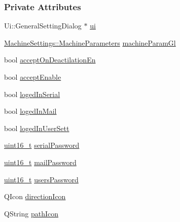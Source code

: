 \subsubsection*{Private Attributes}
\begin{DoxyCompactItemize}
\item 
Ui\+::\+General\+Setting\+Dialog $\ast$ \mbox{\hyperlink{classGeneralSettingDialog_a2985b76397645d9f6d0cd00bccb337dc}{ui}}
\item 
\mbox{\hyperlink{classMachineSettings_a87879e13793dbc7c10d4fa18e1236751}{Machine\+Settings\+::\+Machine\+Parameters}} \mbox{\hyperlink{classGeneralSettingDialog_a61add6dfb9616d6309206cda8af09899}{machine\+Param\+Gl}}
\item 
bool \mbox{\hyperlink{classGeneralSettingDialog_a73bdef0f355634453cce0f75ccf0c173}{accept\+On\+Deactilation\+En}}
\item 
bool \mbox{\hyperlink{classGeneralSettingDialog_a63cb4068f4e5f307a5c09bc0806d0345}{accept\+Enable}}
\item 
bool \mbox{\hyperlink{classGeneralSettingDialog_acc7b6201adba8b9e35dc675d212047cc}{loged\+In\+Serial}}
\item 
bool \mbox{\hyperlink{classGeneralSettingDialog_aed1425f6474086f9fc89cbe24e6f3409}{loged\+In\+Mail}}
\item 
bool \mbox{\hyperlink{classGeneralSettingDialog_a21fbb6d0ad1c22a90032d3fed66a247f}{loged\+In\+User\+Sett}}
\item 
\mbox{\hyperlink{settings_8h_a017dd44e68049ffdd31500a8cd01ba68}{uint16\+\_\+t}} \mbox{\hyperlink{classGeneralSettingDialog_abaef63e383cc4c45581e16f85fd88a77}{serial\+Password}}
\item 
\mbox{\hyperlink{settings_8h_a017dd44e68049ffdd31500a8cd01ba68}{uint16\+\_\+t}} \mbox{\hyperlink{classGeneralSettingDialog_a214b0ddac5d79aee98e6c6e81fb45380}{mail\+Password}}
\item 
\mbox{\hyperlink{settings_8h_a017dd44e68049ffdd31500a8cd01ba68}{uint16\+\_\+t}} \mbox{\hyperlink{classGeneralSettingDialog_a365c466e185f88bad08aeb6ff036c403}{users\+Password}}
\item 
Q\+Icon \mbox{\hyperlink{classGeneralSettingDialog_ab4b216b0182add4c144d933694556f40}{direction\+Icon}}
\item 
Q\+String \mbox{\hyperlink{classGeneralSettingDialog_a17784de076ae5cfae6e150736d81a9a6}{path\+Icon}}
\end{DoxyCompactItemize}


